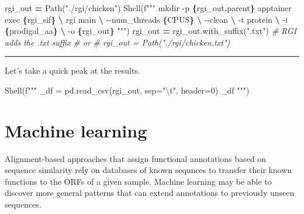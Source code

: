 \documentclass[
]{book}
\newenvironment{Shaded}{\begin{snugshade}}{\end{snugshade}}
\newcommand{\CharTok}[1]{\textcolor[rgb]{0.31,0.60,0.02}{#1}}
\newcommand{\CommentTok}[1]{\textcolor[rgb]{0.56,0.35,0.01}{\textit{#1}}}
\newcommand{\NormalTok}[1]{#1}
\newcommand{\OperatorTok}[1]{\textcolor[rgb]{0.81,0.36,0.00}{\textbf{#1}}}
\newcommand{\SpecialCharTok}[1]{\textcolor[rgb]{0.81,0.36,0.00}{\textbf{#1}}}
\newcommand{\SpecialStringTok}[1]{\textcolor[rgb]{0.31,0.60,0.02}{#1}}
\newcommand{\StringTok}[1]{\textcolor[rgb]{0.31,0.60,0.02}{#1}}
\begin{document}
\begin{Shaded}
\begin{Highlighting}[numbers=left,,]
\NormalTok{rgi\_out }\OperatorTok{=}\NormalTok{ Path(}\StringTok{"./rgi/chicken"}\NormalTok{)}
\NormalTok{Shell(}\SpecialStringTok{f"""}
\SpecialStringTok{mkdir {-}p }\SpecialCharTok{\{}\NormalTok{rgi\_out}\SpecialCharTok{.}\NormalTok{parent}\SpecialCharTok{\}}
\SpecialStringTok{apptainer exec }\SpecialCharTok{\{}\NormalTok{rgi\_sif}\SpecialCharTok{\}}\SpecialStringTok{ }\OperatorTok{\textbackslash{}}
\SpecialStringTok{    rgi main }\OperatorTok{\textbackslash{}}
\SpecialStringTok{        {-}{-}num\_threads }\SpecialCharTok{\{}\NormalTok{CPUS}\SpecialCharTok{\}}\SpecialStringTok{ }\OperatorTok{\textbackslash{}}
\SpecialStringTok{        {-}{-}clean }\OperatorTok{\textbackslash{}}
\SpecialStringTok{        {-}t protein }\OperatorTok{\textbackslash{}}
\SpecialStringTok{        {-}i }\SpecialCharTok{\{}\NormalTok{prodigal\_aa}\SpecialCharTok{\}}\SpecialStringTok{ }\OperatorTok{\textbackslash{}}
\SpecialStringTok{        {-}o }\SpecialCharTok{\{}\NormalTok{rgi\_out}\SpecialCharTok{\}}
\SpecialStringTok{"""}\NormalTok{)}
\NormalTok{rgi\_out }\OperatorTok{=}\NormalTok{ rgi\_out.with\_suffix(}\StringTok{".txt"}\NormalTok{) }\CommentTok{\# RGI adds the .txt suffix}
\CommentTok{\# or}
\CommentTok{\# rgi\_out = Path("./rgi/chicken.txt")}
\end{Highlighting}
\end{Shaded}

\begin{center}\rule{0.5\linewidth}{0.5pt}\end{center}

Let's take a quick peak at the results.

\begin{Shaded}
\begin{Highlighting}[numbers=left,,]
\NormalTok{Shell(}\SpecialStringTok{f"""}
\SpecialStringTok{\_df = pd.read\_csv(rgi\_out, sep="}\CharTok{\textbackslash{}t}\SpecialStringTok{", header=0)}
\SpecialStringTok{\_df}
\SpecialStringTok{"""}\NormalTok{)}
\end{Highlighting}
\end{Shaded}

\section{Machine learning}\label{machine-learning}

Alignment-based approaches that assign functional annotations based on sequence similarity rely on databases of known sequnces
to transfer their known functions to the ORFs of a given sample. Machine learning may be able to discover more general patterns
that can extend annotations to previously unseen sequences.
\end{document}
